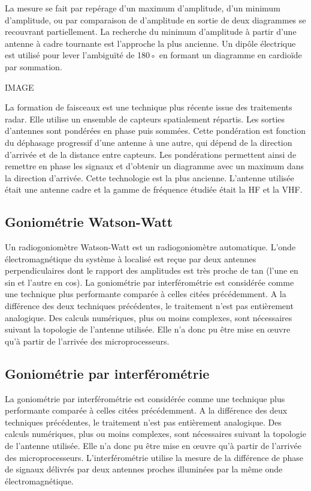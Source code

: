 	La mesure se fait par repérage d’un maximum d’amplitude, d’un minimum d’amplitude, ou par comparaison de d’amplitude en sortie de deux diagrammes se recouvrant partiellement. La recherche du minimum d’amplitude à partir d’une antenne à cadre tournante est l’approche la plus ancienne. Un dipôle électrique est utilisé pour lever l’ambiguïté de 180◦ en formant un diagramme en cardioïde par sommation.
	
	IMAGE
	
	La formation de faisceaux est une technique plus récente issue des traitements radar. Elle utilise un ensemble de capteurs spatialement répartis. Les sorties d’antennes sont pondérées en phase puis sommées. Cette pondération est fonction du déphasage progressif d’une antenne à une autre, qui dépend de la direction d’arrivée et de la distance entre capteurs. Les pondérations permettent ainsi de remettre en phase les signaux et d’obtenir un diagramme avec un maximum dans la direction d’arrivée.
 Cette technologie est la plus ancienne. L’antenne utilisée était une antenne cadre et la gamme de fréquence étudiée était la HF et la VHF.

\subsection{Goniométrie Watson-Watt}

	Un radiogoniomètre Watson-Watt est un radiogoniomètre automatique. L’onde électromagnétique du système à localisé est reçue par deux antennes perpendiculaires dont le rapport des amplitudes est très proche de tan (l’une en sin et l’autre en cos). La goniométrie par interférométrie est considérée comme une technique plus performante comparée à celles citées précédemment. A la différence des deux techniques précédentes, le traitement n’est pas entièrement analogique. Des calculs numériques, plus ou moins complexes, sont nécessaires suivant la topologie de l’antenne utilisée. Elle n’a donc pu être mise en œuvre qu’à partir de l’arrivée des microprocesseurs.

\subsection{Goniométrie par interférométrie}

	La goniométrie par interférométrie est considérée comme une technique plus performante comparée à celles citées précédemment. A la différence des deux techniques précédentes, le traitement n’est pas entièrement analogique. Des calculs numériques, plus ou moins complexes, sont nécessaires suivant la topologie de l’antenne utilisée. Elle n’a donc pu être mise en œuvre qu’à partir de l’arrivée des microprocesseurs.
L’interférométrie utilise la mesure de la différence de phase de signaux délivrés par deux antennes proches illuminées par la même onde électromagnétique.

